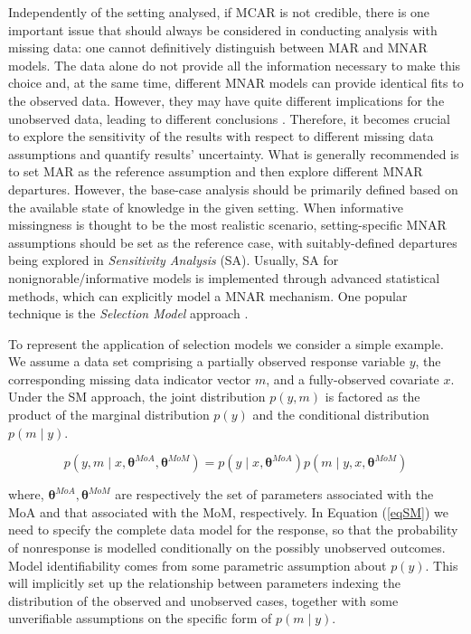 \documentclass[]{article}
\begin{document}
Independently of the setting analysed, if MCAR is not credible, there is
one important issue that should always be considered in conducting
analysis with missing data: one cannot definitively distinguish between
MAR and MNAR models. The data alone do not provide all the information
necessary to make this choice and, at the same time, different MNAR
models can provide identical fits to the observed data. However, they
may have quite different implications for the unobserved data, leading
to different conclusions \citep{Molenberghsb}. Therefore, it becomes
crucial to explore the sensitivity of the results with respect to
different missing data assumptions and quantify results' uncertainty.
What is generally recommended is to set MAR as the reference assumption
and then explore different MNAR departures. However, the base-case
analysis should be primarily defined based on the available state of
knowledge in the given setting. When informative missingness is thought
to be the most realistic scenario, setting-specific MNAR
assumptions should be set as the reference case, with suitably-defined
departures being explored in \textit{Sensitivity Analysis} (SA).
Usually, SA for nonignorable/informative models is implemented through
advanced statistical methods, which can explicitly model a MNAR
mechanism. One popular technique is the \textit{Selection Model}
approach \citep{Molenberghsb, Daniels, Masona}.

To represent the application of selection models we consider a simple
example. We assume a data set comprising a partially observed response
variable \(y\), the corresponding missing data indicator vector \(m\),
and a fully-observed covariate \(x\). Under the SM approach, the joint
distribution \(p(y,m)\) is factored as the product of the marginal
distribution \(p(y)\) and the conditional distribution \(p(m \mid y)\).

\begin{equation}\label{eqSM}
p(y,m\mid x,\bm{\theta}^{MoA},\bm{\theta}^{MoM})=p(y\mid x,\bm{\theta}^{MoA})p(m\mid y,x,\bm{\theta}^{MoM})
\end{equation}

where, \(\bm{\theta}^{MoA},\bm{\theta}^{MoM}\) are respectively the set
of parameters associated with the MoA and that associated with the MoM,
respectively. In Equation (\ref{eqSM}) we need to specify the complete
data model for the response, so that the probability of nonresponse is
modelled conditionally on the possibly unobserved outcomes. Model
identifiability comes from some parametric assumption about \(p(y)\).
This will implicitly set up the relationship between parameters indexing
the distribution of the observed and unobserved cases, together with
some unverifiable assumptions on the specific form of \(p(m\mid y)\).
\end{document}
